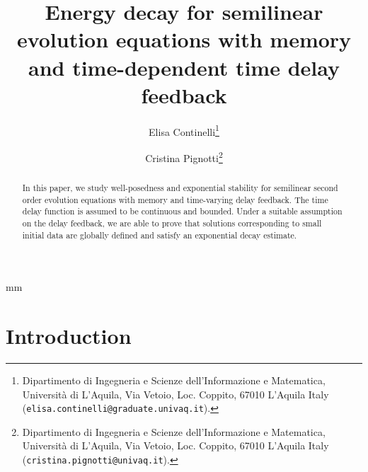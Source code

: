 \documentclass[11pt]{article}
\title{Energy decay for semilinear evolution equations with memory and time-dependent time delay feedback}
\author{
Elisa Continelli\footnote{Dipartimento di Ingegneria e Scienze dell'Informazione e Matematica, Universit\`{a} di L'Aquila, Via Vetoio, Loc. Coppito, 67010 L'Aquila Italy (\texttt{elisa.continelli@graduate.univaq.it}).}
\and
Cristina Pignotti\footnote{Dipartimento di Ingegneria e Scienze dell'Informazione e Matematica, Universit\`{a} di L'Aquila, Via Vetoio, Loc. Coppito, 67010 L'Aquila Italy (\texttt{cristina.pignotti@univaq.it}).}
}
\begin{document}
 mm



\textheight=225mm



\parindent=8mm



\frenchspacing



\maketitle



\begin{abstract}
In this paper, we study well-posedness and exponential stability for semilinear second order evolution equations with memory and time-varying delay feedback. The time delay function is assumed to be continuous and bounded. Under a suitable assumption on  the delay feedback, we are able to prove that solutions corresponding to small initial data
are globally defined and satisfy an exponential decay estimate.
\end{abstract}


\vspace{5 mm}



\def\qed{\hbox{\hskip 6pt\vrule width6pt
height7pt
depth1pt  \hskip1pt}\bigskip}











\section{Introduction}
\label{pbform}

\setcounter{equation}{0}
\end{document}
